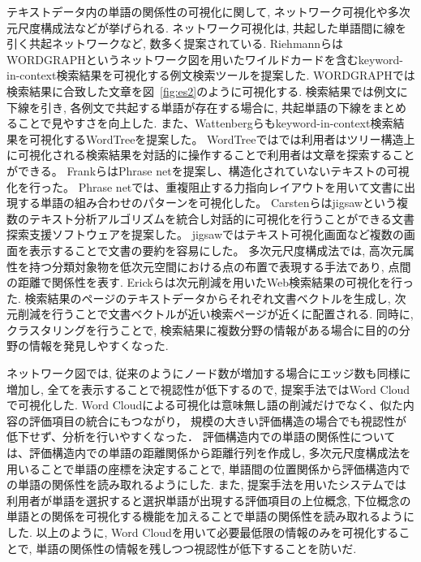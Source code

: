 \documentclass[syuuron]{kuee}
\begin{document}
		テキストデータ内の単語の関係性の可視化に関して, ネットワーク可視化や多次元尺度構成法などが挙げられる. 
		ネットワーク可視化は, 共起した単語間に線を引く共起ネットワークなど, 数多く提案されている. 
		RiehmannらはWORDGRAPHというネットワーク図を用いたワイルドカードを含むkeyword-in-context検索結果を可視化する例文検索ツールを提案した\cite{wg1}. 
		WORDGRAPHでは検索結果に合致した文章を図~\ref{fig:es2}のように可視化する. 
		検索結果では例文に下線を引き, 各例文で共起する単語が存在する場合に, 共起単語の下線をまとめることで見やすさを向上した. 
		また、Wattenbergらもkeyword-in-context検索結果を可視化するWordTreeを提案した\cite{wt1}。
		WordTreeではでは利用者はツリー構造上に可視化される検索結果を対話的に操作することで利用者は文章を探索することができる。
		FrankらはPhrase netを提案し、構造化されていないテキストの可視化を行った\cite{pn1}。
		Phrase netでは、重複阻止する力指向レイアウトを用いて文書に出現する単語の組み合わせのパターンを可視化した。
		Carstenらはjigsawという複数のテキスト分析アルゴリズムを統合し対話的に可視化を行うことができる文書探索支援ソフトウェアを提案した\cite{jig1}。
		jigsawではテキスト可視化画面など複数の画面を表示することで文書の要約を容易にした。
		多次元尺度構成法では, 高次元属性を持つ分類対象物を低次元空間における点の布置で表現する手法であり, 点間の距離で関係性を表す. 
		Erickらは次元削減を用いたWeb検索結果の可視化を行った\cite{or1}. 
		検索結果のページのテキストデータからそれぞれ文書ベクトルを生成し, 次元削減を行うことで文書ベクトルが近い検索ページが近くに配置される. 
		同時に, クラスタリングを行うことで, 検索結果に複数分野の情報がある場合に目的の分野の情報を発見しやすくなった. 
		
		ネットワーク図では, 従来のようにノード数が増加する場合にエッジ数も同様に増加し, 全てを表示することで視認性が低下するので, 
		提案手法ではWord Cloudで可視化した. 
		Word Cloudによる可視化は意味無し語の削減だけでなく、似た内容の評価項目の統合にもつながり，
		規模の大きい評価構造の場合でも視認性が低下せず、分析を行いやすくなった．
		評価構造内での単語の関係性については、評価構造内での単語の距離関係から距離行列を作成し, 
		多次元尺度構成法を用いることで単語の座標を決定することで, 単語間の位置関係から評価構造内での単語の関係性を読み取れるようにした. 
		また, 提案手法を用いたシステムでは利用者が単語を選択すると選択単語が出現する評価項目の上位概念, 
		下位概念の単語との関係を可視化する機能を加えることで単語の関係性を読み取れるようにした.
		以上のように, Word Cloudを用いて必要最低限の情報のみを可視化することで, 単語の関係性の情報を残しつつ視認性が低下することを防いだ. 
		
\end{document}
